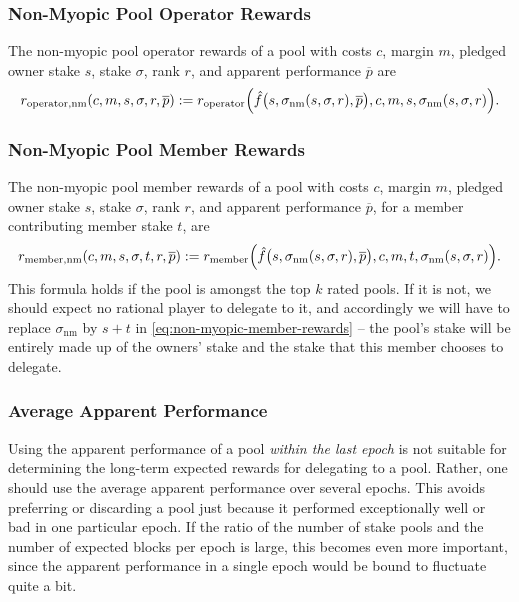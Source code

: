 \documentclass[11pt,a4paper,dvipsnames,twosided]{article}
\newcommand\pbar{\overline{p}}
\begin{document}
\subsubsection{Non-Myopic Pool Operator Rewards}
\label{non-myopic-pool-operator-rewards}

The non-myopic pool operator rewards of a pool with costs \(c\), margin \(m\),
pledged owner stake \(s\), stake \(\sigma\), rank \(r\), and apparent
performance \(\pbar\) are
\[
    r_\mathrm{operator, nm}(c, m, s, \sigma, r, \pbar) :=
    r_\mathrm{operator}\Bigl(
    \hat{f}\bigl(s,\sigma_\mathrm{nm}(s,\sigma, r), \pbar\bigr),
    c, m, s, \sigma_\mathrm{nm}(s,\sigma,r)\Bigr).
\]

\subsubsection{Non-Myopic Pool Member Rewards}
\label{non-myopic-pool-member-rewards}

The non-myopic pool member rewards of a pool with costs \(c\), margin \(m\),
pledged owner stake \(s\), stake \(\sigma\), rank \(r\), and apparent
performance \(\pbar\), for a member contributing member stake \(t\), are
\begin{equation}
    r_\mathrm{member, nm}(c, m, s, \sigma, t, r, \pbar) :=
    r_\mathrm{member}\Bigl(\hat{f}\bigl(s,\sigma_\mathrm{nm}(s,\sigma, r),
    \pbar\bigr),
    c, m, t, \sigma_\mathrm{nm}(s,\sigma,r)\Bigr).
\label{eq:non-myopic-member-rewards}
\end{equation}
This formula holds if the pool is amongst the top \(k\) rated pools. If it is
not, we should expect no rational player to delegate to it, and accordingly we
will have to replace \(\sigma_\mathrm{nm}\) by \(s + t\) in
\cref{eq:non-myopic-member-rewards} -- the pool's stake will be entirely made up
of the owners' stake and the stake that this member chooses to delegate.

\subsubsection{Average Apparent Performance}
\label{average-apparent-performance}

Using the apparent performance of a pool \emph{within the last epoch} is not
suitable for determining the long-term expected rewards for delegating to a
pool. Rather, one should use the average apparent performance over several
epochs. This avoids preferring or discarding a pool just because it performed
exceptionally well or bad in one particular epoch. If the ratio of the number of
stake pools and the number of expected blocks per epoch is large, this becomes
even more important, since the apparent performance in a single epoch would be
bound to fluctuate quite a bit.
\end{document}
